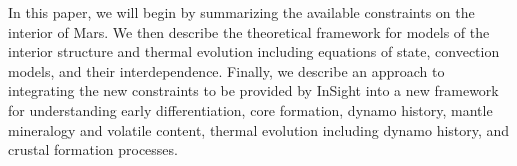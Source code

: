 In this paper, we will begin by summarizing the available constraints on the interior of Mars.  We then describe the theoretical framework for models of the interior structure and thermal evolution including equations of state, convection models, and their interdependence. Finally, we describe an approach to integrating the new constraints to be provided by InSight into a new framework for understanding early differentiation, core formation, dynamo history, mantle mineralogy and volatile content, thermal evolution including dynamo history, and crustal formation processes. 

